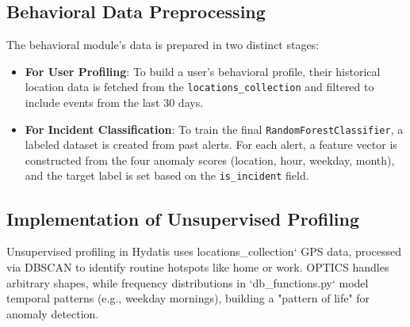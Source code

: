 \documentclass[12pt,a4paper,oneside,english]{book}
\begin{document}
{\subsection{Behavioral Data Preprocessing}
The behavioral module's data is prepared in two distinct stages:
\begin{itemize}
    \item \textbf{For User Profiling}: To build a user's behavioral profile, their historical location data is fetched from the \texttt{locations\_collection} and filtered to include events from the last 30 days.
    \item \textbf{For Incident Classification}: To train the final \texttt{RandomForestClassifier}, a labeled dataset is created from past alerts. For each alert, a feature vector is constructed from the four anomaly scores (location, hour, weekday, month), and the target label is set based on the \texttt{is\_incident} field.
\end{itemize}
\subsection{Implementation of Unsupervised Profiling}
\label{sec:unsupervised_implementation}
%
Unsupervised profiling in Hydatis uses locations\_collection` GPS data, processed via 
DBSCAN to identify routine hotspots like home or work. OPTICS handles arbitrary shapes, 
while frequency distributions in `db\_functions.py` model temporal 
patterns (e.g., weekday mornings), building a "pattern of life" for anomaly detection.


}
\end{document}

